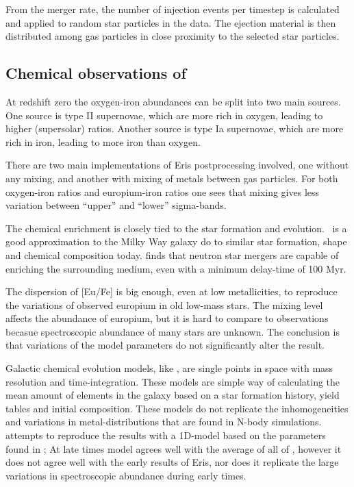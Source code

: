 From the merger rate, the number of injection events per timestep is calculated and applied to random star particles in the data. The ejection material is then distributed among gas particles in close proximity to the selected star particles.

\subsection{Chemical observations of \eris}
At redshift zero the oxygen-iron abundances can be split into two main sources.
One source is type II supernovae, which are more rich in oxygen, leading to higher (supersolar) ratios.
Another source is type Ia supernovae, which are more rich in iron, leading to more iron than oxygen.

There are two main implementations of Eris postprocessing involved, one without any mixing, and another with mixing of metals between gas particles. For both oxygen-iron ratios and europium-iron ratios one sees that mixing gives less variation between ``upper'' and ``lower'' sigma-bands.

The chemical enrichment is closely tied to the star formation and evolution. \eris\ is a good approximation to the Milky Way galaxy do to similar star formation, shape and chemical composition today.
 finds that neutron star mergers are capable of enriching the surrounding medium, even with a minimum delay-time of 100 Myr.

The dispersion of [Eu/Fe] is big enough, even at low metallicities, to reproduce the variations of observed europium in old low-mass stars.
The mixing level affects the abundance of europium, but it is hard to compare to observations becasue spectroscopic abundance of many stars are unknown.
The conclusion is that variations of the model parameters do not significantly alter the result.

Galactic chemical evolution models, like \omegamodel, are single points in space with mass resolution and time-integration. These models are simple way of calculating the mean amount of elements in the galaxy based on a star formation history, yield tables and initial composition.
These models do not replicate the inhomogeneities and variations in metal-distributions that are found in N-body simulations.
 attempts to reproduce the results with a 1D-model based on the parameters found in \eris;
At late times model agrees well with the average of all of \eris, however it does not agree well with the early results of Eris, nor does it replicate the large variations in spectroscopic abundance during early times.

